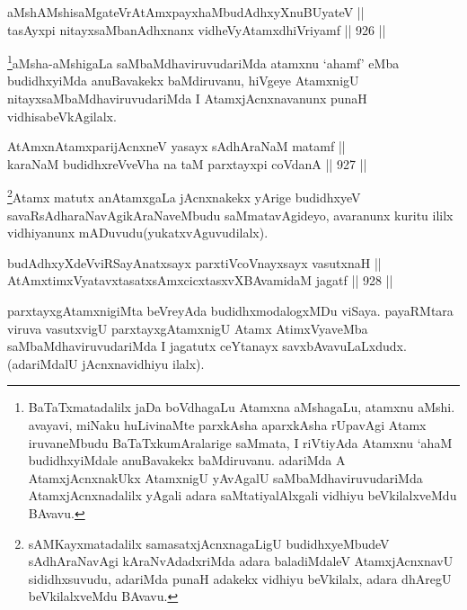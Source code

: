 
\begin{shl}
aMshAMshisaMgateVrAtAmx\s payxhaMbudAdhxyX\s nuBUyateV || \\
tasAyxpi nitayxsaMbanAdhxnanx vidheVyA\s \s tamxdhiVriyamf \hfill || 926 ||  
\end{shl}

\begin{artha}
\footnote{BaTaTxmatadalilx jaDa boVdhagaLu Atamxna aMshagaLu, atamxnu aMshi. avayavi, miNaku huLivinaMte parxkAsha aparxkAsha rUpavAgi Atamx iruvaneMbudu BaTaTxkumAralarige saMmata, I riVtiyAda Atamxnu `ahaM budidhxyiMdale anuBavakekx baMdiruvanu. adariMda A AtamxjAcnxnakUkx AtamxnigU yAvAgalU saMbaMdhaviruvudariMda AtamxjAcnxnadalilx yAgali adara saMtatiyalAlxgali vidhiyu beVkilalxveMdu BAvavu.}aMsha-aMshigaLa saMbaMdhaviruvudariMda atamxnu `ahamf' eMba budidhxyiMda anuBavakekx baMdiruvanu, hiVgeye AtamxnigU nitayxsaMbaMdhaviruvudariMda I AtamxjAcnxnavanunx punaH vidhisabeVkAgilalx.
\end{artha}


\begin{shl}
AtAmxnAtamxparijAcnxneV yasayx sAdhAraNaM matamf || \\
karaNaM budidhxreVveVha na taM parxtayxpi coVdanA \hfill || 927 ||  
\end{shl}

\begin{artha}
\footnote{sAMKayxmatadalilx samasatxjAcnxnagaLigU budidhxyeMbudeV sAdhAraNavAgi kAraNvAdadxriMda adara baladiMdaleV AtamxjAcnxnavU sididhxsuvudu, adariMda punaH adakekx vidhiyu beVkilalx, adara dhAregU beVkilalxveMdu BAvavu.}Atamx matutx anAtamxgaLa jAcnxnakekx yArige budidhxyeV savaRsAdharaNavAgikAraNaveMbudu saMmatavAgideyo, avaranunx kuritu ililx vidhiyanunx mADuvudu(yukatxvAguvudilalx).
\end{artha}


\begin{shl}
budAdhxyXdeVviRSayAnatxsayx parxtiVcoV\s nayxsayx vasutxnaH || \\
AtAmxtimxVyatavxtasatxsAmxcicxtasxvXBAvamidaM jagatf \hfill || 928 ||  
\end{shl}

\begin{artha}
parxtayxgAtamxnigiMta beVreyAda budidhxmodalogxMDu viSaya. payaRMtara viruva vasutxvigU parxtayxgAtamxnigU Atamx AtimxVyaveMba saMbaMdhaviruvudariMda I jagatutx ceYtanayx savxbAvavuLaLxdudx.(adariMdalU jAcnxnavidhiyu ilalx).
\end{artha}

